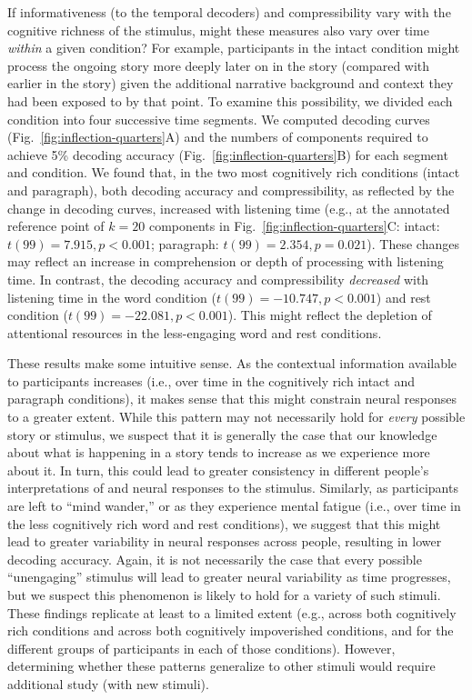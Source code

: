 \documentclass[english, 11pt]{article}
\begin{document}
If informativeness (to the temporal decoders) and compressibility vary with the
cognitive richness of the stimulus, might these measures also vary over time
\textit{within} a given condition? For example, participants in the intact
condition might process the ongoing story more deeply later on in the story
(compared with earlier in the story) given the additional narrative background
and context they had been exposed to by that point. To examine this
possibility, we divided each condition into four successive time segments. We
computed decoding curves (Fig.~\ref{fig:inflection-quarters}A) and the numbers
of components required to achieve 5\% decoding accuracy
(Fig.~\ref{fig:inflection-quarters}B) for each segment and condition. We found
that, in the two most cognitively rich conditions (intact and paragraph), both
decoding accuracy and compressibility, as reflected by the change in decoding
curves, increased with listening time (e.g., at the annotated reference point
of $k = 20$ components in Fig.~\ref{fig:inflection-quarters}C: intact: $t(99) =
7.915, p < 0.001$; paragraph: $t(99) = 2.354, p = 0.021$). These changes may
reflect an increase in comprehension or depth of processing with listening
time. In contrast, the decoding accuracy and compressibility \textit{decreased}
with listening time in the word condition ($t(99) = -10.747, p < 0.001$) and
rest condition ($t(99) = -22.081, p < 0.001$). This might reflect the
depletion of attentional resources in the less-engaging word and rest
conditions.

These results make some intuitive sense. As the contextual information
available to participants increases (i.e., over time in the cognitively rich
intact and paragraph conditions), it makes sense that this might
constrain neural responses to a greater extent. While this pattern may not
necessarily hold for \textit{every} possible story or stimulus, we suspect that
it is generally the case that our knowledge about what is happening in a story
tends to increase as we experience more about it. In turn, this could lead to
greater consistency in different people's interpretations of and neural
responses to the stimulus. Similarly, as participants are left to ``mind
wander,'' or as they experience mental fatigue (i.e., over time in the less
cognitively rich word and rest conditions), we suggest that this might
lead to greater variability in neural responses across people, resulting in
lower decoding accuracy. Again, it is not necessarily the case that every
possible ``unengaging'' stimulus will lead to greater neural variability as
time progresses, but we suspect this phenomenon is likely to hold for a variety
of such stimuli. These findings replicate at least to a limited extent (e.g.,
across both cognitively rich conditions and across both cognitively
impoverished conditions, and for the different groups of participants in each
of those conditions). However, determining whether these patterns generalize to
other stimuli would require additional study (with new stimuli).
\end{document}
